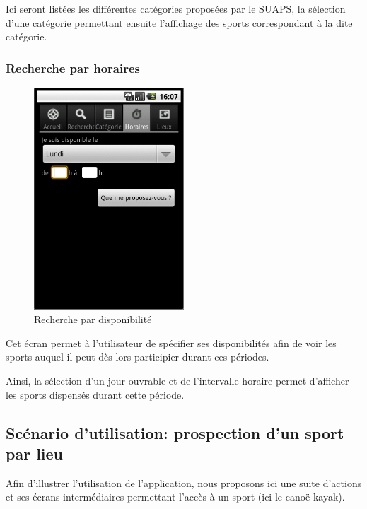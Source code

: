 \documentclass{article}
\begin{document}
		Ici seront listées les différentes catégories proposées par le SUAPS, la
		sélection d'une catégorie permettant ensuite l'affichage des sports
		correspondant à la dite catégorie.

		\subsubsection{Recherche par horaires}

		\begin{figure}[ht]
			\centering
			\includegraphics[width=0.5\textwidth]{horaires.png}
			\caption{Recherche par disponibilité}
			\label{fig:horaires}
		\end{figure}

		Cet écran permet à l'utilisateur de spécifier ses disponibilités afin de
		voir les sports auquel il peut dès lors participier durant ces périodes.

		Ainsi, la sélection d'un jour ouvrable et de l'intervalle horaire permet
		d'afficher les sports dispensés durant cette période.

	\subsection{Scénario d'utilisation: prospection d'un sport par lieu}

	Afin d'illustrer l'utilisation de l'application, nous proposons ici une suite
	d'actions et ses écrans intermédiaires permettant l'accès à un sport (ici le
	canoë-kayak).
\end{document}
